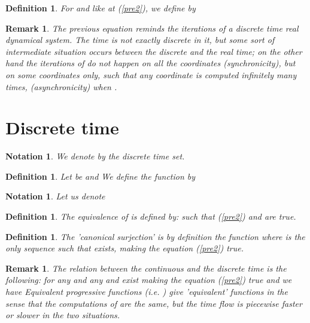 \documentclass[12pt]{article}\usepackage{amsmath}
\newtheorem{definition}[theorem]{Definition}
\newtheorem{notation}[theorem]{Notation}
\newtheorem{remark}[theorem]{Remark}
\begin{document}
\begin{definition}
\label{Def20}For  and  like at (\ref{pre2}), we define  by 

\end{definition}

\begin{remark}
The previous equation reminds the iterations of a discrete time real dynamical
system. The time is not exactly discrete in it, but some sort of intermediate
situation occurs between the discrete and the real time; on the other hand the
iterations of  do not happen on all the coordinates (synchronicity), but
on some coordinates only, such that any coordinate  is computed
infinitely many times,  (asynchronicity) when .
\end{remark}

\section{Discrete time}

\begin{notation}
We denote by
the discrete time set.
\end{notation}

\begin{definition}
Let be  and  We define the function
 by 

\end{definition}

\begin{notation}
Let us denote

\end{notation}

\begin{definition}
The equivalence of  is defined by:  such that (\ref{pre2}) and
are true.
\end{definition}

\begin{definition}
The 'canonical surjection'  is by
definition the function 
where  is the only sequence such that  exists, making the equation (\ref{pre2}) true.
\end{definition}

\begin{remark}
The relation between the continuous and the discrete time is the following:
for any  and any   and  exist making the equation (\ref{pre2}) true
and we have
Equivalent progressive functions  (i.e.
) give 'equivalent' functions  in the sense that the computations of
 are the same, but the time flow is piecewise faster or slower in the
two situations.
\end{remark}
\end{document}
